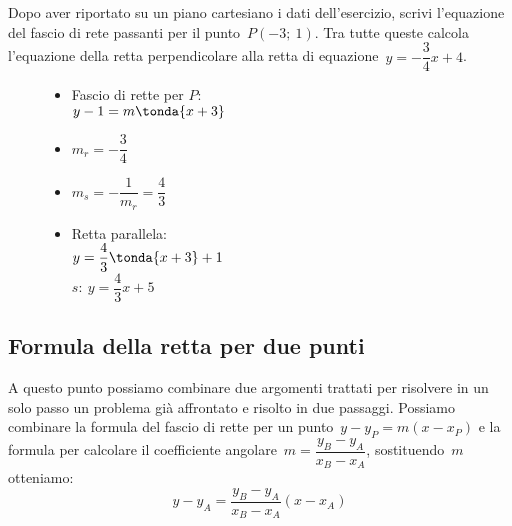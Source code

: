  \begin{esempio}
  Dopo aver riportato su un piano cartesiano i dati dell'esercizio,
  scrivi l'equazione del fascio di rete passanti per il punto~\(P(-3;~1)\).
  Tra tutte queste calcola l'equazione della retta perpendicolare alla retta 
  di equazione~\(y=-\dfrac{3}{4}x+4\).

\begin{inaccessibleblock}
 \begin{figure}[h]
\centering \hspace{-5mm}
 \begin{minipage}[]{.40\textwidth}
  \begin{itemize}
  \item Fascio di rette per \(P\): \\
  \(y -1 = m \tonda{x +3}\)
  \item \(m_r = -\dfrac{3}{4}\)
  \item \(m_s = - \dfrac{1}{m_r} = \dfrac{4}{3}\)
  \item Retta parallela: \\
  \(y = \dfrac{4}{3} \tonda{x +3} +1\)\\
  \(s:~y = \dfrac{4}{3} x +5\)
  \end{itemize}
 \end{minipage}
 \begin{minipage}[]{.60\textwidth}
   \centering \fascioperp
 \end{minipage}
\label{fig:fascioperp}
\end{figure}
\end{inaccessibleblock}
 \end{esempio}

\subsection{Formula della retta per due punti}

A questo punto possiamo combinare due argomenti trattati per risolvere in un
solo passo un problema già affrontato e risolto in due passaggi. 
Possiamo combinare la formula del fascio di rette per un 
punto~\(y - y_P = m (x - x_P)\)
e la formula per calcolare il 
coefficiente angolare~\(m = \dfrac{y_B - y_A}{x_B - x_A}\), 
sostituendo~\(m\) otteniamo:
\[y - y_A = \dfrac{y_B - y_A}{x_B - x_A} (x - x_A)\]

